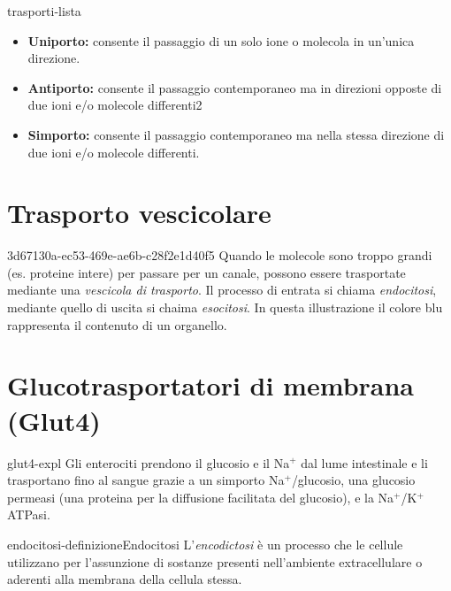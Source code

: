 \documentclass[preview]{standalone}
\begin{document}
\begin{snippet}{trasporti-lista}
    \begin{itemize}
        \item \textbf{Uniporto:} consente il passaggio di un solo ione o molecola in un'unica direzione.
        \item \textbf{Antiporto:} consente il passaggio contemporaneo ma in direzioni opposte di due ioni e/o molecole differenti2
        \item \textbf{Simporto:} consente il passaggio contemporaneo ma nella stessa direzione di due ioni e/o molecole differenti.
    \end{itemize}
\end{snippet}

\section{Trasporto vescicolare}

\begin{snippet}{3d67130a-ec53-469e-ae6b-c28f2e1d40f5}
    Quando le molecole sono troppo grandi (es. proteine intere) per passare per un canale, possono essere trasportate 
mediante una \textit{vescicola di trasporto}. Il processo di entrata si chiama \textit{endocitosi},
mediante quello di uscita si chaima \textit{esocitosi}. 
In questa illustrazione il colore blu rappresenta il contenuto di un organello.
\end{snippet}


\section{Glucotrasportatori di membrana (Glut4)}

\begin{snippet}{glut4-expl}
    Gli enterociti prendono il glucosio e il Na\({}^+\) dal lume intestinale
e li trasportano fino al sangue grazie a un simporto Na\({}^+\)/glucosio, una glucosio permeasi
(una proteina per la diffusione facilitata del glucosio), e la Na\({}^+\)/K\({}^+\)ATPasi. 
\end{snippet}

\begin{snippetdefinition}{endocitosi-definizione}{Endocitosi}
    L'\textit{encodictosi} è un processo che le cellule utilizzano per l'assunzione di sostanze presenti nell'ambiente extracellulare o aderenti alla membrana della cellula stessa.
\end{snippetdefinition}
\end{document}
